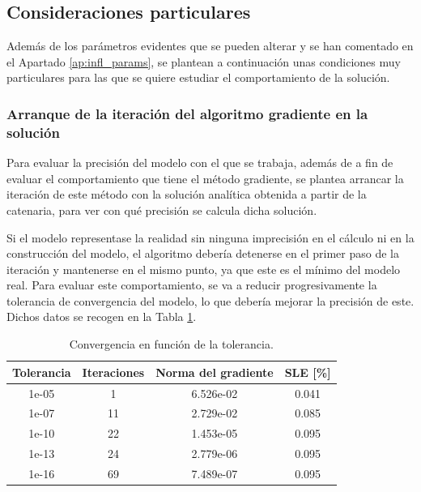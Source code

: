 \subsection{Consideraciones particulares}

Además de los parámetros evidentes que se pueden alterar y se han comentado en el Apartado \ref{ap:infl_params}, se plantean a continuación unas condiciones muy particulares para las que se quiere estudiar el comportamiento de la solución.

\subsubsection{Arranque de la iteración del algoritmo gradiente en la solución}

Para evaluar la precisión del modelo con el que se trabaja, además de a fin de evaluar el comportamiento que tiene el método gradiente, se plantea arrancar la iteración de este método con la solución analítica obtenida a partir de la catenaria, para ver con qué precisión se calcula dicha solución. 

Si el modelo representase la realidad sin ninguna imprecisión en el cálculo ni en la construcción del modelo, el algoritmo debería detenerse en el primer paso de la iteración y mantenerse en el mismo punto, ya que este es el mínimo del modelo real. Para evaluar este comportamiento, se va a reducir progresivamente la tolerancia de convergencia del modelo, lo que debería mejorar la precisión de este. Dichos datos se recogen en la Tabla \ref{tab:tol}.

\begin{table}[h]
    \centering
    \begin{tabular}{|c|c|c|c|}
        \hline
        \textbf{Tolerancia} & \textbf{Iteraciones} & \textbf{Norma del gradiente} & \textbf{SLE [\%]} \\ \hline \hline
        1e-05 &  1 & 6.526e-02 & 0.041 \\ \hline
        1e-07 & 11 & 2.729e-02 & 0.085 \\ \hline
        1e-10 & 22 & 1.453e-05 & 0.095 \\ \hline
        1e-13 & 24 & 2.779e-06 & 0.095 \\ \hline
        1e-16 & 69 & 7.489e-07 & 0.095 \\ \hline
    \end{tabular}
    \caption{Convergencia en función de la tolerancia.}
    \label{tab:tol}
\end{table}

